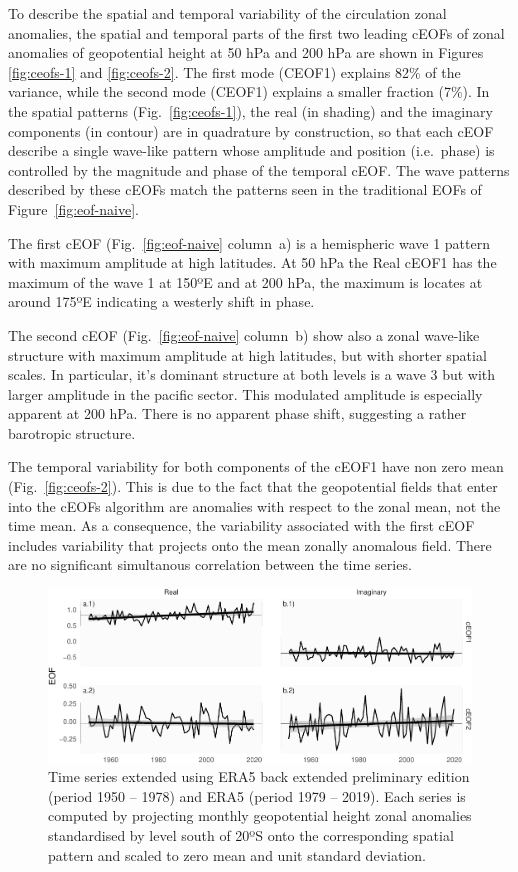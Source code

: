 \documentclass[smallextended]{svjour3}       %
\begin{document}
To describe the spatial and temporal variability of the circulation zonal anomalies, the spatial and temporal parts of the first two leading cEOFs of zonal anomalies of geopotential height at 50 hPa and 200 hPa are shown in Figures \ref{fig:ceofs-1} and \ref{fig:ceofs-2}. The first mode (CEOF1) explains 82\% of the variance, while the second mode (CEOF1) explains a smaller fraction (7\%). In the spatial patterns (Fig.~\ref{fig:ceofs-1}), the real (in shading) and the imaginary components (in contour) are in quadrature by construction, so that each cEOF describe a single wave-like pattern whose amplitude and position (i.e.~phase) is controlled by the magnitude and phase of the temporal cEOF. The wave patterns described by these cEOFs match the patterns seen in the traditional EOFs of Figure~\ref{fig:eof-naive}.

The first cEOF (Fig.~\ref{fig:eof-naive} column~a) is a hemispheric wave 1 pattern with maximum amplitude at high latitudes. At 50 hPa the Real cEOF1 has the maximum of the wave 1 at 150ºE and at 200 hPa, the maximum is locates at around 175ºE indicating a westerly shift in phase.

The second cEOF (Fig.~\ref{fig:eof-naive} column~b) show also a zonal wave-like structure with maximum amplitude at high latitudes, but with shorter spatial scales. In particular, it's dominant structure at both levels is a wave 3 but with larger amplitude in the pacific sector. This modulated amplitude is especially apparent at 200 hPa. There is no apparent phase shift, suggesting a rather barotropic structure.

The temporal variability for both components of the cEOF1 have non zero mean (Fig.~\ref{fig:ceofs-2}). This is due to the fact that the geopotential fields that enter into the cEOFs algorithm are anomalies with respect to the zonal mean, not the time mean. As a consequence, the variability associated with the first cEOF includes variability that projects onto the mean zonally anomalous field. There are no significant simultanous correlation between the time series.



\begin{figure}
\includegraphics{../figures/extended-series-1} \caption{Time series extended using ERA5 back extended preliminary edition (period 1950 -- 1978) and ERA5 (period 1979 -- 2019). Each series is computed by projecting monthly geopotential height zonal anomalies standardised by level south of 20ºS onto the corresponding spatial pattern and scaled to zero mean and unit standard deviation.}\label{fig:extended-series}
\end{figure}
\end{document}
